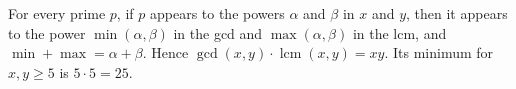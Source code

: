 For every prime $p$, if $p$ appears to the powers $\alpha$ and $\beta$ in $x$ and $y$, then it appears to the power $\min(\alpha,\beta)$ in the gcd and $\max(\alpha,\beta)$ in the lcm, and $\min+\max=\alpha+\beta$. Hence $\gcd(x,y)\cdot\operatorname{lcm}(x,y)=xy$. Its minimum for $x,y\ge5$ is $5\cdot5=\boxed{25}$.

